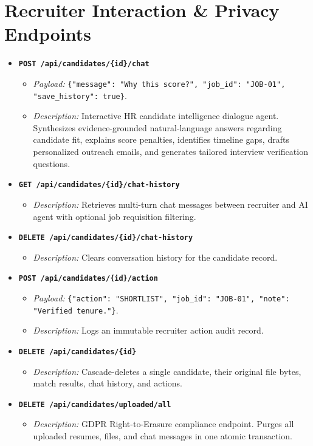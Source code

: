 \documentclass[11pt,a4paper]{report}
\begin{document}
\section{Recruiter Interaction \& Privacy Endpoints}
\begin{itemize}[leftmargin=1.5em]
    \item \textbf{\texttt{POST /api/candidates/\{id\}/chat}}
    \begin{itemize}
        \item \emph{Payload:} \texttt{\{"message": "Why this score?", "job\_id": "JOB-01", "save\_history": true\}}.
        \item \emph{Description:} Interactive HR candidate intelligence dialogue agent. Synthesizes evidence-grounded natural-language answers regarding candidate fit, explains score penalties, identifies timeline gaps, drafts personalized outreach emails, and generates tailored interview verification questions.
    \end{itemize}
    \item \textbf{\texttt{GET /api/candidates/\{id\}/chat-history}}
    \begin{itemize}
        \item \emph{Description:} Retrieves multi-turn chat messages between recruiter and AI agent with optional job requisition filtering.
    \end{itemize}
    \item \textbf{\texttt{DELETE /api/candidates/\{id\}/chat-history}}
    \begin{itemize}
        \item \emph{Description:} Clears conversation history for the candidate record.
    \end{itemize}
    \item \textbf{\texttt{POST /api/candidates/\{id\}/action}}
    \begin{itemize}
        \item \emph{Payload:} \texttt{\{"action": "SHORTLIST", "job\_id": "JOB-01", "note": "Verified tenure."\}}.
        \item \emph{Description:} Logs an immutable recruiter action audit record.
    \end{itemize}
    \item \textbf{\texttt{DELETE /api/candidates/\{id\}}}
    \begin{itemize}
        \item \emph{Description:} Cascade-deletes a single candidate, their original file bytes, match results, chat history, and actions.
    \end{itemize}
    \item \textbf{\texttt{DELETE /api/candidates/uploaded/all}}
    \begin{itemize}
        \item \emph{Description:} GDPR Right-to-Erasure compliance endpoint. Purges all uploaded resumes, files, and chat messages in one atomic transaction.
    \end{itemize}
\end{itemize}
\end{document}

